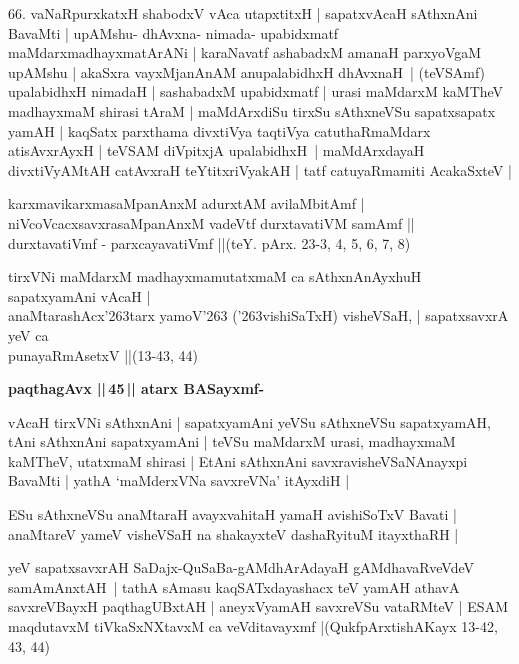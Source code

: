 \begin{artha}
66. vaNaRpurxkatxH shabodxV vAca utapxtitxH | sapatxvAcaH sAthxnAni BavaMti |\label{153}
upAMshu- dhAvxna- nimada- upa\-bidxmatf maMdarxmadhayxmatArANi | karaNavatf
ashabadxM amanaH parxyoVgaM upAMshu | akaSxra vayxMjanAnAM anupalabidhxH dhAvxnaH~|
(teVSAmf) upalabidhxH nimadaH | sashabadxM upabidxmatf | urasi maMdarxM kaMTheV madhayxmaM shirasi tAraM | maMdArxdiSu tirxSu sAthxneVSu sapatxsapatx yamAH | kaqSatx parxthama divxtiVya taqtiVya catuthaRmaMdarx atisAvxrAyxH | teVSAM diVpitxjA upalabidhxH~| maMdArxdayaH divxtiVyAMtAH catAvxraH teYtitxriVyakAH | tatf catuyaRmamiti AcakaSxteV |
\end{artha}

\begin{shloka}
karxmavikarxmasaMpanAnxM adurxtAM avilaMbitAmf |\\
niVcoVcacxsavxrasaMpanAnxM vadeVtf durxtavatiVM samAmf ||\\
durxtavatiVmf - parxcayavatiVmf ||\hfill{(teY. pArx. 23-3, 4, 5, 6, 7, 8)}
\end{shloka}

\begin{shloka}
tirxVNi maMdarxM madhayxmamutatxmaM ca sAthxnAnAyxhuH sapatxyamAni vAcaH |\\\label{154}
anaMtarashAcx\char'263tarx yamoV\char'263 (\char'263vishiSaTxH) visheVSaH, |
sapatxsavxrA yeV ca\\
punayaRmAsetxV ||\hfill{(13-43, 44)}
\end{shloka}

{\bigskip
\noindent
{\large\bf paqthagAvx ||\,45\,|| atarx BASayxmf-}}
\medskip

\noindent
\begin{artha}
vAcaH tirxVNi sAthxnAni | sapatxyamAni yeVSu sAthxneVSu sapatxyamAH, tAni sAthxnAni sapatxyamAni | teVSu maMdarxM urasi, madhayxmaM kaMTheV, utatxmaM shirasi | EtAni sAthxnAni savxravisheVSaNAnayxpi BavaMti | yathA `maMderxVNa savxreVNa' itAyxdiH |
\end{artha}

\begin{shloka}
ESu sAthxneVSu anaMtaraH avayxvahitaH yamaH avishiSoTxV Bavati |\\
anaMtareV yameV visheVSaH na shakayxteV dashaRyituM itayxthaRH |
\end{shloka}

\noindent
\begin{artha}
yeV sapatxsavxrAH SaDajx-QuSaBa-gAMdhArAdayaH gAMdhavaRveVdeV samAmAnxtAH~| tathA sAmasu kaqSATxdayashacx teV yamAH athavA savxreVBayxH paqthagUBxtAH | aneyxVyamAH savxreVSu vataRMteV | ESAM maqdutavxM tiVkaSxNXtavxM ca veVditavayxmf |\hfill{(QukfpArxtishAKayx 13-42, 43, 44)}
\end{artha}

